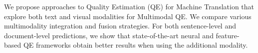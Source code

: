 We propose approaches to Quality Estimation (QE) for Machine Translation that explore both text and visual modalities for Multimodal QE. We compare various multimodality integration and fusion strategies. For both sentence-level and document-level predictions, we show that state-of-the-art neural and feature-based QE frameworks obtain better results when using the additional modality.
